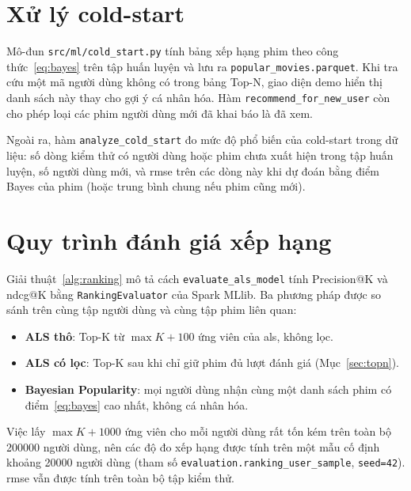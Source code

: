 \section{Xử lý cold-start}
\label{sec:cold_start}
Mô-đun \texttt{src/ml/cold\_start.py} tính bảng xếp hạng phim theo công thức~\eqref{eq:bayes} trên tập huấn luyện và lưu ra \texttt{popular\_movies.parquet}. Khi tra cứu một mã người dùng không có trong bảng Top-N, giao diện demo hiển thị danh sách này thay cho gợi ý cá nhân hóa. Hàm \texttt{recommend\_for\_new\_user} còn cho phép loại các phim người dùng mới đã khai báo là đã xem.

Ngoài ra, hàm \texttt{analyze\_cold\_start} đo mức độ phổ biến của cold-start trong dữ liệu: số dòng kiểm thử có người dùng hoặc phim chưa xuất hiện trong tập huấn luyện, số người dùng mới, và \gls{rmse} trên các dòng này khi dự đoán bằng điểm Bayes của phim (hoặc trung bình chung nếu phim cũng mới).

\section{Quy trình đánh giá xếp hạng}
\label{sec:eval_protocol}
Giải thuật~\ref{alg:ranking} mô tả cách \texttt{evaluate\_als\_model} tính Precision@K và \gls{ndcg}@K bằng \texttt{RankingEvaluator} của Spark MLlib. Ba phương pháp được so sánh trên cùng tập người dùng và cùng tập phim liên quan:
\begin{itemize}
    \item \textbf{ALS thô}: Top-K từ $\max K + 100$ ứng viên của \gls{als}, không lọc.
    \item \textbf{ALS có lọc}: Top-K sau khi chỉ giữ phim đủ lượt đánh giá (Mục~\ref{sec:topn}).
    \item \textbf{Bayesian Popularity}: mọi người dùng nhận cùng một danh sách phim có điểm~\eqref{eq:bayes} cao nhất, không cá nhân hóa.
\end{itemize}
Việc lấy $\max K + 1000$ ứng viên cho mỗi người dùng rất tốn kém trên toàn bộ \num{200000} người dùng, nên các độ đo xếp hạng được tính trên một mẫu cố định khoảng \num{20000} người dùng (tham số \texttt{evaluation.ranking\_user\_sample}, \texttt{seed=42}). \gls{rmse} vẫn được tính trên toàn bộ tập kiểm thử.

